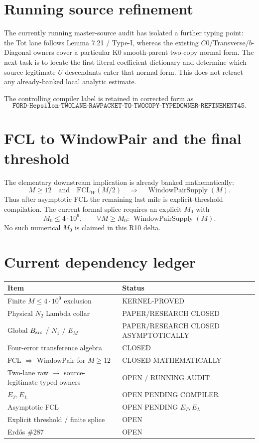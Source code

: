 \documentclass[11pt]{article}
\newcommand{\1}{\mathbf 1}
\newcommand{\status}[1]{\textsf{#1}}
\begin{document}
\section{Running source refinement}
The currently running master-source audit has isolated a further typing point: the Tot lane follows Lemma 7.21 / Type-I, whereas the existing $C0$/Transverse/$b$-Diagonal owners cover a particular K0 smooth-parent two-copy normal form. The next task is to locate the first literal coefficient dictionary and determine which source-legitimate $U$ descendants enter that normal form. This does not retract any already-banked local analytic estimate.

The controlling compiler label is retained in corrected form as
\[
 \boxed{\texttt{FORD-Hepsilon-TWOLANE-RAWPACKET-TO-TWOCOPY-TYPEDOWNER-REFINEMENT45}.}
\]

\section{FCL to WindowPair and the final threshold}
The elementary downstream implication is already banked mathematically:
\[
 M\ge12\quad\text{and}\quad \mathrm{FCL}_W(M/2)
 \quad\Longrightarrow\quad \operatorname{WindowPairSupply}(M).
\]
Thus after asymptotic FCL the remaining last mile is explicit-threshold compilation. The current formal splice requires an explicit $M_0$ with
\[
 M_0\le4\cdot10^9,
 \qquad
 \forall M\ge M_0:\ \operatorname{WindowPairSupply}(M).
\]
No such numerical $M_0$ is claimed in this R10 delta.

\section{Current dependency ledger}
\begin{center}
\small
\begin{tabularx}{\textwidth}{>{\raggedright\arraybackslash}p{}X}
\toprule
Item & Status\\
\midrule
Finite $M\le4\cdot10^9$ exclusion & \status{KERNEL-PROVED}\\
Physical $N_2$ Lambda collar & \status{PAPER/RESEARCH CLOSED}\\
Global $B_{\rm src}$ / $N_1$ / $E_M$ & \status{PAPER/RESEARCH CLOSED ASYMPTOTICALLY}\\
Four-error transference algebra & \status{CLOSED}\\
FCL $\Rightarrow$ WindowPair for $M\ge12$ & \status{CLOSED MATHEMATICALLY}\\
Two-lane raw $\to$ source-legitimate typed owners & \status{OPEN / RUNNING AUDIT}\\
$E_T,E_L$ & \status{OPEN PENDING COMPILER}\\
Asymptotic FCL & \status{OPEN PENDING $E_T,E_L$}\\
Explicit threshold / finite splice & \status{OPEN}\\
Erd\H{o}s \#287 & \status{OPEN}\\
\bottomrule
\end{tabularx}
\end{center}
\end{document}
